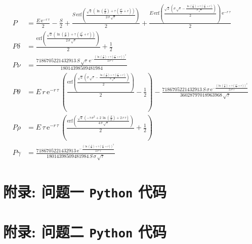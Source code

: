 \begin{equation}\label{E:5}
    \begin{aligned}
        P &= \frac{E\,{\mathrm{e}}^{-r\,\tau }}{2}-\frac{S}{2}+\frac{S\,\mathrm{erf}\left(\frac{\sqrt{2}\,\left(\ln\left(\frac{S}{E}\right)+\tau \,\left(\frac{\sigma ^2}{2}+r\right)\right)}{2\,\sigma \,\sqrt{\tau }}\right)}{2}+\frac{E\,\mathrm{erf}\left(\frac{\sqrt{2}\,\left(\sigma \,\sqrt{\tau }-\frac{\ln\left(\frac{S}{E}\right)+\tau \,\left(\frac{\sigma ^2}{2}+r\right)}{\sigma \,\sqrt{\tau }}\right)}{2}\right)\,{\mathrm{e}}^{-r\,\tau }}{2} \\
        P\delta &= \frac{\mathrm{erf}\left(\frac{\sqrt{2}\,\left(\ln\left(\frac{S}{E}\right)+\tau \,\left(\frac{\sigma ^2}{2}+r\right)\right)}{2\,\sigma \,\sqrt{\tau }}\right)}{2}+\frac{1}{2} \\
        P\nu &= \frac{7186705221432913\,S\,\sqrt{\tau }\,{\mathrm{e}}^{-\frac{{\left(\ln\left(\frac{S}{E}\right)+\tau \,\left(\frac{\sigma ^2}{2}+r\right)\right)}^2}{2\,\sigma ^2\,\tau }}}{18014398509481984} \\
        P\theta &= E\,r\,{\mathrm{e}}^{-r\,\tau }\,\left(\frac{\mathrm{erf}\left(\frac{\sqrt{2}\,\left(\sigma \,\sqrt{\tau }-\frac{\ln\left(\frac{S}{E}\right)+\tau \,\left(\frac{\sigma ^2}{2}+r\right)}{\sigma \,\sqrt{\tau }}\right)}{2}\right)}{2}-\frac{1}{2}\right)-\frac{7186705221432913\,S\,\sigma \,{\mathrm{e}}^{-\frac{{\left(\ln\left(\frac{S}{E}\right)+\tau \,\left(\frac{\sigma ^2}{2}+r\right)\right)}^2}{2\,\sigma ^2\,\tau }}}{36028797018963968\,\sqrt{\tau }} \\
        P\rho &= E\,\tau \,{\mathrm{e}}^{-r\,\tau }\,\left(\frac{\mathrm{erf}\left(\frac{\sqrt{2}\,\left(-\tau \,\sigma ^2+2\,\ln\left(\frac{S}{E}\right)+2\,r\,\tau \right)}{4\,\sigma \,\sqrt{\tau }}\right)}{2}+\frac{1}{2}\right) \\
        P\gamma &= \frac{7186705221432913\,{\mathrm{e}}^{-\frac{{\left(\ln\left(\frac{S}{E}\right)+\tau \,\left(\frac{\sigma ^2}{2}+r\right)\right)}^2}{2\,\sigma ^2\,\tau }}}{18014398509481984\,S\,\sigma \,\sqrt{\tau }}
    \end{aligned}
\end{equation}



\clearpage
\appendix
    \section{附录: 问题一 \texttt{Python} 代码}\label{A:1}
    \section{附录: 问题二 \texttt{Python} 代码}\label{A:2}
